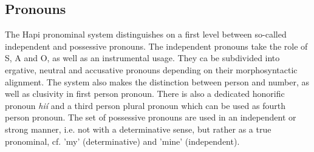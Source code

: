 \documentclass[a4paper, 12pt, oneside]{memoir}
\newcommand{\emh}[1]{\textit{#1}}
\begin{document}
\subsection{Pronouns}\label{spronouns}
The Hapi pronominal system distinguishes on a first level between so-called independent and possessive pronouns. The independent pronouns take the role of S, A and O, as well as an instrumental usage. They ca be subdivided into ergative, neutral and accusative pronouns depending on their morphosyntactic alignment. The system also makes the distinction between person and number, as well as clusivity in first person pronoun. There is also a dedicated honorific pronoun \emh{hií} and a third person plural pronoun which can be used as fourth person pronoun.
The set of possessive pronouns are used in an independent or strong manner, i.e. not with a determinative sense, but rather as a true pronominal, cf. 'my' (determinative) and 'mine' (independent).
\end{document}
